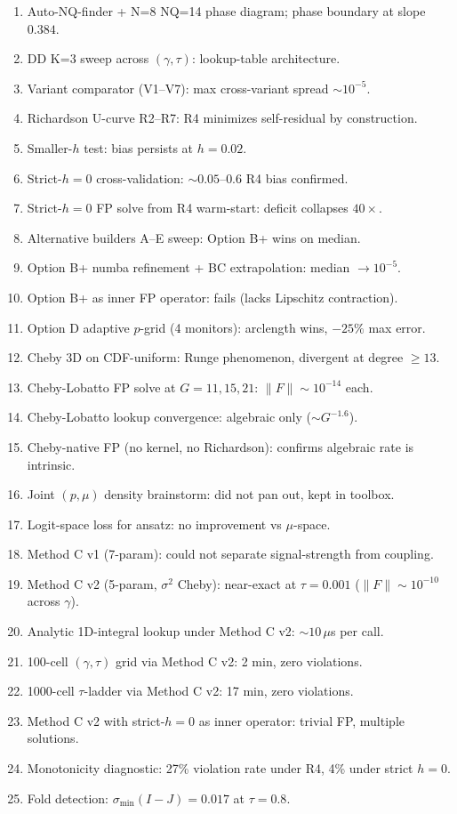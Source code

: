\documentclass[11pt]{article}
\begin{document}
\begin{enumerate}\itemsep1pt
  \item Auto-NQ-finder + N=8 NQ=14 phase diagram; phase boundary at slope $0.384$.
  \item DD K=3 sweep across $(\gamma, \tau)$: lookup-table architecture.
  \item Variant comparator (V1--V7): max cross-variant spread $\sim 10^{-5}$.
  \item Richardson U-curve R2--R7: R4 minimizes self-residual by construction.
  \item Smaller-$h$ test: bias persists at $h = 0.02$.
  \item Strict-$h{=}0$ cross-validation: $\sim 0.05$--$0.6$ R4 bias confirmed.
  \item Strict-$h{=}0$ FP solve from R4 warm-start: deficit collapses $40{\times}$.
  \item Alternative builders A--E sweep: Option B+ wins on median.
  \item Option B+ numba refinement + BC extrapolation: median $\to 10^{-5}$.
  \item Option B+ as inner FP operator: fails (lacks Lipschitz contraction).
  \item Option D adaptive $p$-grid (4 monitors): arclength wins, $-25\%$ max error.
  \item Cheby $3$D on CDF-uniform: Runge phenomenon, divergent at degree $\ge 13$.
  \item Cheby-Lobatto FP solve at $G = 11, 15, 21$: $\|F\| \sim 10^{-14}$ each.
  \item Cheby-Lobatto lookup convergence: algebraic only ($\sim G^{-1.6}$).
  \item Cheby-native FP (no kernel, no Richardson): confirms algebraic rate is intrinsic.
  \item Joint $(p, \mu)$ density brainstorm: did not pan out, kept in toolbox.
  \item Logit-space loss for ansatz: no improvement vs $\mu$-space.
  \item Method C v1 (7-param): could not separate signal-strength from coupling.
  \item Method C v2 (5-param, $\sigma^2$ Cheby): near-exact at $\tau = 0.001$ ($\|F\| \sim 10^{-10}$ across $\gamma$).
  \item Analytic 1D-integral lookup under Method C v2: $\sim 10\,\mu$s per call.
  \item 100-cell $(\gamma, \tau)$ grid via Method C v2: 2 min, zero violations.
  \item 1000-cell $\tau$-ladder via Method C v2: 17 min, zero violations.
  \item Method C v2 with strict-$h{=}0$ as inner operator: trivial FP, multiple solutions.
  \item Monotonicity diagnostic: 27\% violation rate under R4, 4\% under strict $h{=}0$.
  \item Fold detection: $\sigma_{\min}(I-J) = 0.017$ at $\tau = 0.8$.
\end{enumerate}
\end{document}
